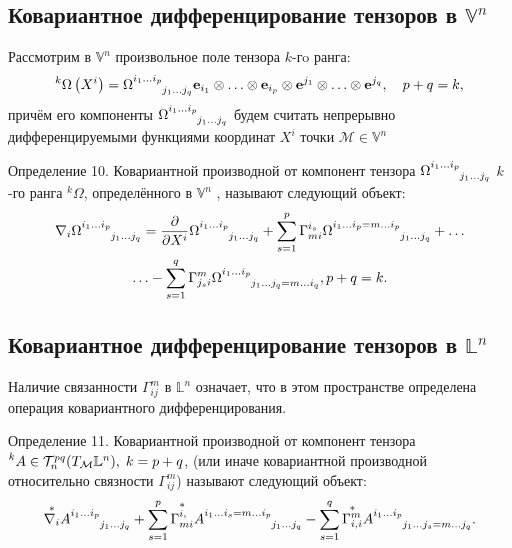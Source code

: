 \documentclass[14pt,a4paper]{extarticle}
\begin{document}
\subsection{Ковариантное дифференцирование тензоров в $\mathbb{V}^n$}
Рассмотрим в $\mathbb{V}^n$ произвольное поле тензора $k$-гo ранга:
\begin{equation}\label{eq23}
	^{k} \Omega\left(X^{i}\right)=\Omega\indices{^{i_{1} \ldots i_{p}}_{j_1 \ldots j_q }} \mathbf{e}_{i_{1}} \otimes \ldots \otimes \mathbf{e}_{i_{p}} \otimes \mathbf{e}^{j_{1}} \otimes \ldots \otimes \mathbf{e}^{j_{q}}, \quad p+q=k,
\end{equation}
причём его компоненты $\Omega\indices{^{i_{1} \ldots i_{p}}_{j_1 \ldots j_q }}$ будем считать непрерывно дифференцируемыми функциями координат $X^i$ точки $\mathcal{M} \in \mathbb{V}^n$

Определение 10. Ковариантной производной от компонент тензора $\Omega\indices{^{i_{1} \ldots i_{p}}_{j_1 \ldots j_q }}$ $k$-го ранга $^{k} \Omega$, определённого в $\mathbb{V}^n$ , называют следующий объект:
\begin{multline}\label{eq24}
	\nabla_i \Omega\indices{^{i_{1} \ldots i_{p}}_{j_1 \ldots j_q }} = \pdv{}{X^i} \Omega\indices{^{i_{1} \ldots i_{p}}_{j_1 \ldots j_q }} + \sum\limits_{s=1}^{p} \Gamma_{mi}^{i_s} \Omega\indices{^{i_{1} \ldots i_{p} = m \ldots i_p}_{j_1 \ldots j_q }} + \ldots \\ 
	\ldots - \sum\limits_{s=1}^q \Gamma_{j_si}^{m} \Omega\indices{^{i_{1} \ldots i_{p}}_{j_1 \ldots j_q = m \ldots i_q}}, p+q=k.
\end{multline}

\subsection{Ковариантное дифференцирование тензоров в $\mathbb{L}^n$}
Наличие связанности $\Gamma_{ij}^m$ в $\mathbb{L}^n$ означает, что в этом пространстве определена операция ковариантного дифференцирования.

Определение 11. Ковариантной производной от компонент тензора $\prescript{k}{}{A} \in \mathcal{T}_n^{pq}(T_{\mathcal{M}}\mathbb{L}^n), \; k=p+q$, (или иначе ковариантной производной относительно связности $\Gamma_{ij}^m$) называют следующий объект:
\begin{equation}\label{eq25}
	\overset{*}{\nabla_i}A\indices{^{i_1 \ldots i_p}_{j_1 \ldots j_q}} + \sum\limits_{s = 1}^p \overset{*}{\Gamma_{mi}^{i,}} A\indices{^{i_1 \ldots i_s = m \ldots i_p}_{j_1 \ldots j_q}} - \sum\limits_{s=1}^q \overset{*}{\Gamma_{i,i}^{m}} A\indices{^{i_1 \ldots i_p}_{j_1 \ldots j_s = m \ldots j_q}}.
\end{equation}
\end{document}
